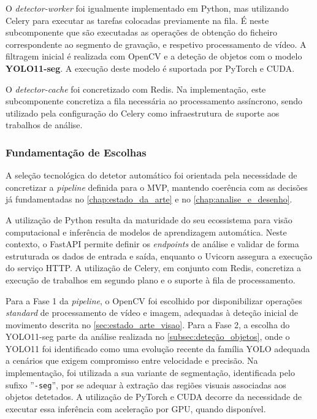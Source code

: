 O \textit{detector-worker} foi igualmente implementado em Python, mas utilizando Celery para executar as tarefas colocadas previamente na fila. É neste subcomponente que são executadas as operações de obtenção do ficheiro correspondente ao segmento de gravação, e respetivo processamento de vídeo. A filtragem inicial é realizada com OpenCV e a deteção de objetos com o modelo \textbf{YOLO11-seg}. A execução deste modelo é suportada por PyTorch e CUDA.

O \textit{detector-cache} foi concretizado com Redis. Na implementação, este subcomponente concretiza a fila necessária ao processamento assíncrono, sendo utilizado pela configuração do Celery como infraestrutura de suporte aos trabalhos de análise.

\subsubsection{Fundamentação de Escolhas}

A seleção tecnológica do detetor automático foi orientada pela necessidade de concretizar a \textit{pipeline} definida para o \gls{MVP}, mantendo coerência com as decisões já fundamentadas no \autoref{chap:estado_da_arte} e no \autoref{chap:analise_e_desenho}.

A utilização de Python resulta da maturidade do seu ecossistema para visão computacional e inferência de modelos de aprendizagem automática. Neste contexto, o FastAPI permite definir os \textit{endpoints} de análise e validar de forma estruturada os dados de entrada e saída, enquanto o Uvicorn assegura a execução do serviço \gls{HTTP}. A utilização de Celery, em conjunto com Redis, concretiza a execução de trabalhos em segundo plano e o suporte à fila de processamento.

Para a Fase 1 da \textit{pipeline}, o OpenCV foi escolhido por disponibilizar operações \textit{standard} de processamento de vídeo e imagem, adequadas à deteção inicial de movimento descrita no \autoref{sec:estado_arte_visao}. Para a Fase 2, a escolha do YOLO11-seg parte da análise realizada no \autoref{subsec:deteção_objetos}, onde o YOLO11 foi identificado como uma evolução recente da família \gls{YOLO} adequada a cenários que exigem compromisso entre velocidade e precisão. Na implementação, foi utilizada a sua variante de segmentação, identificada pelo sufixo ''\texttt{-seg}'', por se adequar à extração das regiões visuais associadas aos objetos detetados. A utilização de PyTorch e CUDA decorre da necessidade de executar essa inferência com aceleração por \gls{GPU}, quando disponível.


